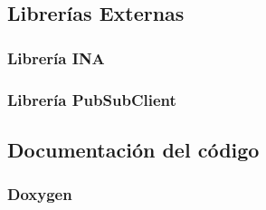 \subsection{Librerías Externas}
\subsubsection{Librería INA}


\subsubsection{Librería PubSubClient}


\subsection{Documentación del código}
\subsubsection{Doxygen}

